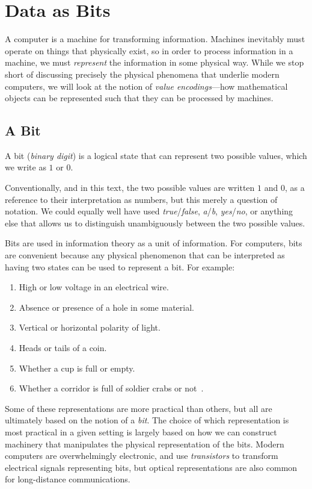 \chapter{Data as Bits}
\label{chap:bits}

A computer is a machine for transforming information.  Machines
inevitably must operate on things that physically exist, so in order
to process information in a machine, we must \emph{represent} the
information in some physical way.  While we stop short of discussing
precisely the physical phenomena that underlie modern computers, we
will look at the notion of \emph{value encodings}---how mathematical
objects can be represented such that they can be processed by
machines.

\section{A Bit}
\label{sec:bit}

\begin{definition}[Bit]
  A bit (\emph{binary digit}) is a logical state that can represent two possible values,
  which we write as $1$ or $0$.
\end{definition}

Conventionally, and in this text, the two possible values are written
$1$ and $0$, as a reference to their interpretation as numbers, but
this merely a question of notation.  We could equally well have used
\emph{true}/\emph{false}, \emph{a}/\emph{b}, \emph{yes}/\emph{no}, or
anything else that allows us to distinguish unambiguously between the
two possible values.

Bits are used in information theory as a unit of information.  For
computers, bits are convenient because any physical phenomenon that
can be interpreted as having two states can be used to represent a
bit.  For example:
\begin{enumerate}
\item High or low voltage in an electrical wire.
\item Absence or presence of a hole in some material.
\item Vertical or horizontal polarity of light.
\item Heads or tails of a coin.
\item Whether a cup is full or empty.
\item Whether a corridor is full of soldier crabs or
  not~\cite{gunji2011robust}.
\end{enumerate}
Some of these representations are more practical than others, but all
are ultimately based on the notion of a \emph{bit}.  The choice of
which representation is most practical in a given setting is largely
based on how we can construct machinery that manipulates the physical
representation of the bits.  Modern computers are overwhelmingly
electronic, and use \emph{transistors} to transform electrical signals
representing bits, but optical representations are also common for
long-distance communications.

